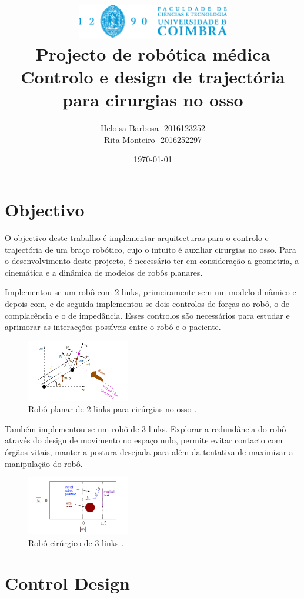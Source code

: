 \documentclass[a4paper,twocolumn,final,11pt]{article}
\title{
	\includegraphics[width=0.5\textwidth]{FCTUC_H_FundoClaro.eps} \\
	\vspace{0.5cm}
	\bfseries  %
	Projecto de robótica médica\\ 
	{\large Controlo e design de trajectória para cirurgias no osso}
}
\author{Heloisa Barbosa- 2016123252 \\ Rita Monteiro -2016252297}
\date{\today}
\begin{document}
\maketitle

\section{Objectivo}
O objectivo deste trabalho é implementar arquitecturas para o controlo e trajectória de um braço robótico, cujo o intuito é  auxiliar cirurgias no osso. Para o desenvolvimento deste projecto, é necessário ter em consideração a geometria, a cinemática e a dinâmica de modelos de robôs planares.

Implementou-se um robô com 2 links, primeiramente sem um modelo dinâmico e depois com, e de seguida implementou-se  dois controlos de forças ao robô, o de complacência e o de impedância.
Esses controlos são necessários para estudar e aprimorar as interacções possíveis entre o robô e o paciente.
\begin{figure}[H]
	\centering
	\includegraphics[width=0.4\textwidth]{f1.png}
	\caption{Robô planar de 2 links para cirúrgias no osso \cite{project}.}
  \label{fig1}
\end{figure}
Também implementou-se um robô de 3 links. Explorar a redundância do robô através do design de movimento no espaço nulo, permite evitar contacto com órgãos vitais, manter a postura desejada para além da tentativa de maximizar a manipulação do robô.
\begin{figure}[H]
	\centering
	\includegraphics[width=0.4\textwidth]{f2.png}
	\caption{Robô cirúrgico de 3 links \cite{project}.}
  \label{fig2}
\end{figure}


\section{Control Design}
\end{document}
